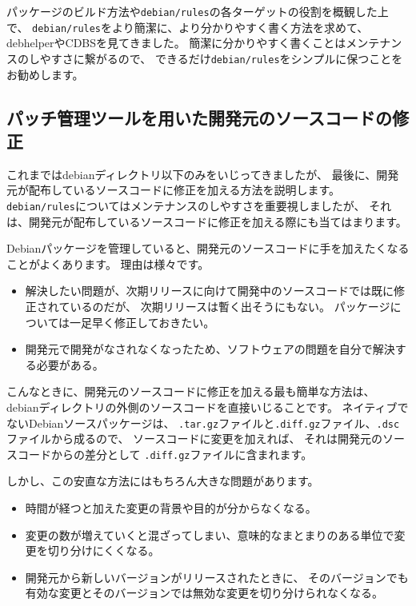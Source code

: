 \documentclass[mingoth,a4paper]{jsarticle}
\begin{document}
パッケージのビルド方法や\texttt{debian/rules}の各ターゲットの役割を概観した上で、
\texttt{debian/rules}をより簡潔に、より分かりやすく書く方法を求めて、
debhelperやCDBSを見てきました。
簡潔に分かりやすく書くことはメンテナンスのしやすさに繋がるので、
できるだけ\texttt{debian/rules}をシンプルに保つことをお勧めします。

\subsection{パッチ管理ツールを用いた開発元のソースコードの修正}

これまではdebianディレクトリ以下のみをいじってきましたが、
最後に、開発元が配布しているソースコードに修正を加える方法を説明します。
\texttt{debian/rules}についてはメンテナンスのしやすさを重要視しましたが、
それは、開発元が配布しているソースコードに修正を加える際にも当てはまります。

Debianパッケージを管理していると、開発元のソースコードに手を加えたくなることがよくあります。
理由は様々です。

\begin{itemize}
 \item 解決したい問題が、次期リリースに向けて開発中のソースコードでは既に修正されているのだが、
  次期リリースは暫く出そうにもない。
  パッケージについては一足早く修正しておきたい。
 \item 開発元で開発がなされなくなったため、ソフトウェアの問題を自分で解決する必要がある。
\end{itemize}

こんなときに、開発元のソースコードに修正を加える最も簡単な方法は、
debianディレクトリの外側のソースコードを直接いじることです。
ネイティブでないDebianソースパッケージは、
\texttt{.tar.gz}ファイルと\texttt{.diff.gz}ファイル、\texttt{.dsc}ファイルから成るので、
ソースコードに変更を加えれば、
それは開発元のソースコードからの差分として \texttt{.diff.gz}ファイルに含まれます。

しかし、この安直な方法にはもちろん大きな問題があります。

\begin{itemize}
 \item 時間が経つと加えた変更の背景や目的が分からなくなる。
 \item 変更の数が増えていくと混ざってしまい、意味的なまとまりのある単位で変更を切り分けにくくなる。
 \item 開発元から新しいバージョンがリリースされたときに、
  そのバージョンでも有効な変更とそのバージョンでは無効な変更を切り分けられなくなる。
\end{itemize}
\end{document}
